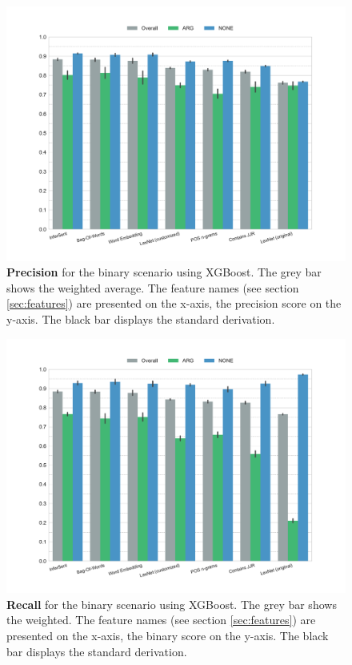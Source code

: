 \begin{figure}[p]
         \caption{\textbf{Precision} for the binary scenario using XGBoost. The grey bar shows the weighted average. The feature names (see section \ref{sec:features}) are presented on the x-axis, the precision score on the y-axis. The black bar displays the standard derivation.} 
    \label{fig:2_precision}
    \centering
	\includegraphics[width=0.9\linewidth]{images/experiments/precision-True}
    \end{figure}
    \begin{figure}[p]
              \caption{\textbf{Recall} for the binary scenario using XGBoost. The grey bar shows the weighted. The feature names (see section \ref{sec:features}) are presented on the x-axis, the binary score on the y-axis. The black bar displays the standard derivation.} 
       \label{fig:2_recall}
 \centering
	\includegraphics[width=0.9\linewidth]{images/experiments/recall-True}

\end{figure}



